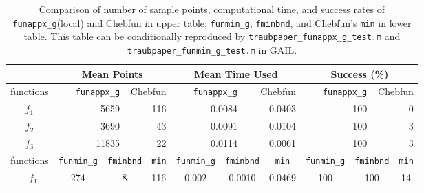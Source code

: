 \documentclass[review]{elsarticle}
\theoremstyle{definition}
\newcommand{\funappxg}{\texttt{funappx\_g}\xspace}
\newcommand{\funappxglobalg}{\texttt{funappxglobal\_g}\xspace}
\newcommand{\funming}{\texttt{funmin\_g}\xspace}
\newcommand{\fminbnd}{\texttt{fminbnd}\xspace}
\begin{document}
%
\begin{table}[bt]
\centering
\caption{Comparison of number of sample points, computational time,  and success
rates of \funappxg (local) %
and Chebfun in upper table;
\funming, \fminbnd, and Chebfun's \texttt{min} in lower table.
This table can be conditionally reproduced by
\texttt{traubpaper\_funappx\_g\_test.m} and \texttt{traubpaper\_funmin\_g\_test.m}  in GAIL.}
\label{tab:localVsGlobalVsChebfun}
{\footnotesize
\setlength{\tabcolsep}{0.38em} %
		\begin{tabular}{crrrrrrrrrrrrrrrrrr}	
		 \hline	
			     &    \multicolumn{6}{c}{\bf Mean Points}   & \multicolumn{6}{c}{\bf Mean Time 
			     Used}  & \multicolumn{6}{c}{\bf Success (\%)}
	  \\ \hline  functions &  \multicolumn{3}{r}{\funappxg}  &    \multicolumn{3}{r}{Chebfun}  
	  &   \multicolumn{3}{r}{\funappxg}   &  \multicolumn{3}{r}{Chebfun} &    
	  \multicolumn{3}{r}{\funappxg}  &   \multicolumn{3}{r}{Chebfun}
\\ \toprule
          $f_1$   &   \multicolumn{3}{r}{5659}       &   \multicolumn{3}{r}{116}       &   
          \multicolumn{3}{r}{0.0084}       &   \multicolumn{3}{r}{0.0403}       &   
          \multicolumn{3}{r}{100}       &   \multicolumn{3}{r}{0}
\\        $f_2$   & \multicolumn{3}{r}{3690}       &   \multicolumn{3}{r}{43}       &   
\multicolumn{3}{r}{0.0091 }       &   \multicolumn{3}{r}{0.0104}       &   
\multicolumn{3}{r}{100}       &   \multicolumn{3}{r}{3}
\\        $f_3$   & \multicolumn{3}{r}{11835}       &   \multicolumn{3}{r}{22}       &   
\multicolumn{3}{r}{0.0114}       &   \multicolumn{3}{r}{0.0061}       &   
\multicolumn{3}{r}{100}       &   \multicolumn{3}{r}{3 }	
\\ \hline
 functions &  \multicolumn{2}{c}{\funming} &  \multicolumn{2}{c}{\fminbnd}  &  
\multicolumn{2}{c}{\texttt{min}}
&  \multicolumn{2}{c}{\funming}  &  \multicolumn{2}{c}{\fminbnd }  &  
\multicolumn{2}{c}{\texttt{min} }  &  \multicolumn{2}{c}{\funming} & 
\multicolumn{2}{c}{\fminbnd} & \multicolumn{2}{c}{\texttt{min}}
\\ \toprule
			$-f_1$   &  \multicolumn{2}{c}{274} &  \multicolumn{2}{c}{8} &  
			\multicolumn{2}{c}{116} &  \multicolumn{2}{c}{0.002} &  
			\multicolumn{2}{c}{0.0010} &  \multicolumn{2}{c}{0.0469} &  
			\multicolumn{2}{c}{100} &  \multicolumn{2}{c}{100 } &  \multicolumn{2}{c}{14}

\end{tabular}}
\end{table}
\end{document}
